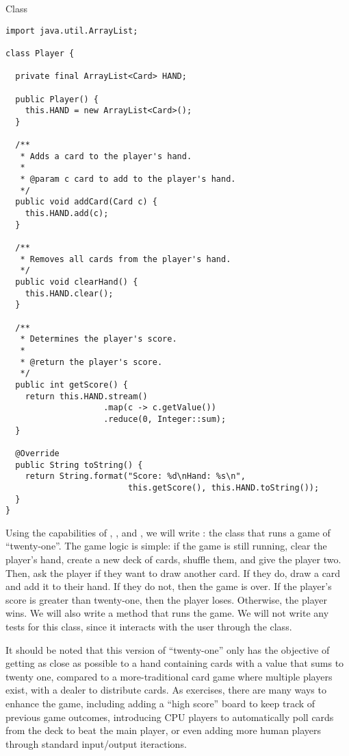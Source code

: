 \begin{cl}{ Class}
\begin{lstlisting}[language=MyJava]
import java.util.ArrayList;

class Player {

  private final ArrayList<Card> HAND;

  public Player() { 
    this.HAND = new ArrayList<Card>(); 
  }

  /**
   * Adds a card to the player's hand.
   *
   * @param c card to add to the player's hand.
   */
  public void addCard(Card c) { 
    this.HAND.add(c); 
  }

  /**
   * Removes all cards from the player's hand.
   */
  public void clearHand() { 
    this.HAND.clear(); 
  }

  /**
   * Determines the player's score.
   *
   * @return the player's score.
   */
  public int getScore() {
    return this.HAND.stream()
                    .map(c -> c.getValue())
                    .reduce(0, Integer::sum);
  }

  @Override
  public String toString() {
    return String.format("Score: %d\nHand: %s\n", 
                         this.getScore(), this.HAND.toString());
  }
}
\end{lstlisting}
\end{cl}

Using the capabilities of , , and , we will write : the class that runs a game of ``twenty-one''. The game logic is simple: if the game is still running, clear the player's hand, create a new deck of cards, shuffle them, and give the player two. Then, ask the player if they want to draw another card. If they do, draw a card and add it to their hand. If they do not, then the game is over. If the player's score is greater than twenty-one, then the player loses. Otherwise, the player wins. We will also write a  method that runs the game. We will not write any tests for this class, since it interacts with the user through the  class.

It should be noted that this version of ``twenty-one'' only has the objective of getting as close as possible to a hand containing cards with a value that sums to twenty one, compared to a more-traditional card game where multiple players exist, with a dealer to distribute cards. As exercises, there are many ways to enhance the game, including adding a ``high score'' board to keep track of previous game outcomes, introducing CPU players to automatically poll cards from the deck to beat the main player, or even adding more human players through standard input/output iteractions. 

